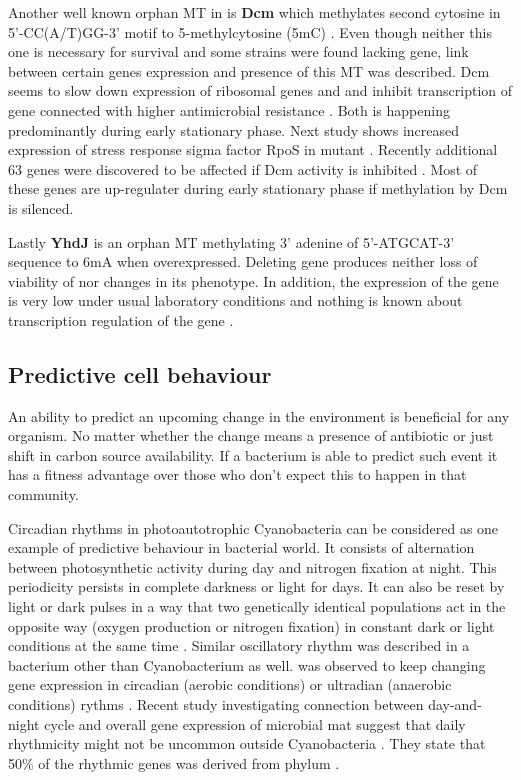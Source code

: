 Another well known orphan MT in  is \textbf{Dcm} which methylates second cytosine in 5'-CC(A/T)GG-3' motif to 5-methylcytosine (5mC) \cite{marinus1973isolation}.
Even though neither this one is necessary for  survival and some strains were found lacking  gene, link between certain genes expression and presence of this MT was described.
Dcm seems to slow down expression of ribosomal genes  and  and inhibit transcription of  gene connected with higher antimicrobial resistance \cite{militello2012conservation, militello2014cytosine}.
Both is happening predominantly during early stationary phase.
Next study shows increased expression of stress response sigma factor RpoS in  mutant \cite{kahramanoglou2012genomics}.
Recently additional 63 genes were discovered to be affected if Dcm activity is inhibited \cite{militello20165}.
Most of these genes are up-regulater during early stationary phase if methylation by Dcm is silenced.

Lastly \textbf{YhdJ} is an orphan MT methylating 3' adenine of 5'-ATGCAT-3' sequence to 6mA when overexpressed.
Deleting  gene produces neither loss of viability of  nor changes in its phenotype.
In addition, the expression of the gene is very low under usual laboratory conditions and nothing is known about transcription regulation of the gene \cite{broadbent2007yhdj}.

\subsection{Predictive cell behaviour}
An ability to predict an upcoming change in the environment is beneficial for any organism.
No matter whether the change means a presence of antibiotic or just shift in carbon source availability.
If a bacterium is able to predict such event it has a fitness advantage over those who don't expect this to happen in that community.

Circadian rhythms in photoautotrophic Cyanobacteria can be considered as one example of predictive behaviour in bacterial world.
It consists of alternation between photosynthetic activity during day and nitrogen fixation at night.
This periodicity persists in complete darkness or light for days.
It can also be reset by light or dark pulses in a way that two genetically identical populations act in the opposite way (oxygen production or nitrogen fixation) in constant dark or light conditions at the same time \cite{kondo1993circadian}.
Similar oscillatory rhythm was described in a bacterium other than Cyanobacterium as well.
 was observed to keep changing gene expression in circadian (aerobic conditions) or ultradian (anaerobic conditions) rythms \cite{min2005rhythmic}.
Recent study investigating connection between day-and-night cycle and overall gene expression of microbial mat suggest that daily rhythmicity might not be uncommon outside Cyanobacteria \cite{hornlein2018daily}.
They state that 50\% of the rhythmic genes was derived from phylum .

